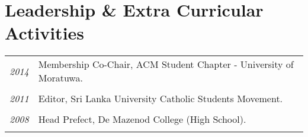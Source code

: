 \documentclass[a4paper,10pt]{article}
\begin{document}
\section{Leadership \& Extra Curricular Activities}
\begin{tabular}{p{3cm}|p{13.5cm}}
\emph{2014} & Membership Co-Chair, ACM Student Chapter - University of Moratuwa.\\\\

\emph{2011} & Editor, Sri Lanka University Catholic Students Movement.\\\\
\emph{2008} & Head Prefect, De Mazenod College (High School).\\\\
\end{tabular}
\end{document}
